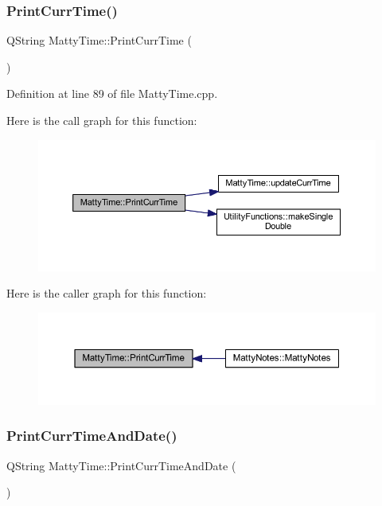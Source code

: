 \subsubsection{\texorpdfstring{Print\+Curr\+Time()}{PrintCurrTime()}}
{\footnotesize\ttfamily Q\+String Matty\+Time\+::\+Print\+Curr\+Time (\begin{DoxyParamCaption}{ }\end{DoxyParamCaption})\hspace{0.3cm}{\ttfamily [static]}}



Definition at line 89 of file Matty\+Time.\+cpp.

Here is the call graph for this function\+:
\nopagebreak
\begin{figure}[H]
\begin{center}
\leavevmode
\includegraphics[width=350pt]{classMattyTime_ac5ecfd2ff5329b3476906b39bbf02ae3_cgraph}
\end{center}
\end{figure}
Here is the caller graph for this function\+:
\nopagebreak
\begin{figure}[H]
\begin{center}
\leavevmode
\includegraphics[width=350pt]{classMattyTime_ac5ecfd2ff5329b3476906b39bbf02ae3_icgraph}
\end{center}
\end{figure}
\hypertarget{classMattyTime_a96805256f90a469aa22824a1e2dd219d}{}\label{classMattyTime_a96805256f90a469aa22824a1e2dd219d} 
\subsubsection{\texorpdfstring{Print\+Curr\+Time\+And\+Date()}{PrintCurrTimeAndDate()}}
{\footnotesize\ttfamily Q\+String Matty\+Time\+::\+Print\+Curr\+Time\+And\+Date (\begin{DoxyParamCaption}{ }\end{DoxyParamCaption})\hspace{0.3cm}{\ttfamily [static]}}




